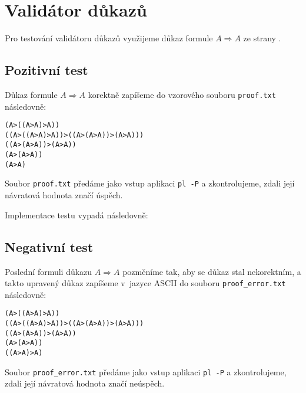 \documentclass[thesis=B,czech,hidelinks]{FITthesis}[2012/06/26]
\begin{document}
\begin{center}

\end{center}

\section{Validátor důkazů}

Pro testování validátoru důkazů využijeme důkaz formule $A \Rightarrow A$ ze strany \pageref{ex:proof}.

\subsection{Pozitivní test}

Důkaz formule $A \Rightarrow A$ korektně zapíšeme do vzorového souboru \texttt{proof.txt} následovně:

\begin{verbatim}
(A>((A>A)>A))
((A>((A>A)>A))>((A>(A>A))>(A>A)))
((A>(A>A))>(A>A))
(A>(A>A))
(A>A)
\end{verbatim}

Soubor \texttt{proof.txt} předáme jako vstup aplikaci \texttt{pl -P} a zkontrolujeme, zdali její návratová hodnota značí úspěch.

Implementace testu vypadá následovně:

\begin{center}

\end{center}

\subsection{Negativní test}

Poslední formuli důkazu $A \Rightarrow A$ pozměníme tak, aby se důkaz stal nekorektním, a takto upravený důkaz zapíšeme v~jazyce ASCII do souboru \texttt{proof\_error.txt} následovně:

\begin{verbatim}
(A>((A>A)>A))
((A>((A>A)>A))>((A>(A>A))>(A>A)))
((A>(A>A))>(A>A))
(A>(A>A))
((A>A)>A)
\end{verbatim}

Soubor \texttt{proof\_error.txt} předáme jako vstup aplikaci \texttt{pl -P} a zkontrolujeme, zdali její návratová hodnota značí neúspěch.
\end{document}
